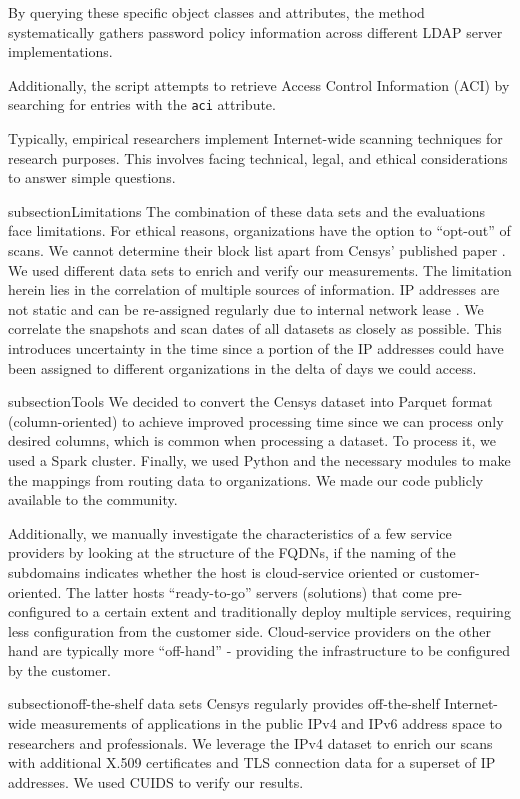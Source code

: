 By querying these specific object classes and attributes, the method systematically gathers password policy information across different LDAP server implementations. 

Additionally, the script attempts to retrieve Access Control Information (ACI) by searching for entries with the \texttt{aci} attribute. 

Typically, empirical researchers implement Internet-wide scanning techniques for research purposes. This involves facing technical, legal, and ethical considerations to answer simple questions.

subsection{Limitations}
The combination of these data sets and the evaluations face limitations. For ethical reasons, organizations have the option to ``opt-out'' of scans. We cannot determine their block list apart from Censys' published paper \cite{censys15}. 
We used different data sets to enrich and verify our measurements. The limitation herein lies in the correlation of multiple sources of information. \gls{IP} addresses are not static and can be re-assigned regularly due to internal network lease \cite{Moura2015}. We correlate the snapshots and scan dates of all datasets as closely as possible. This introduces uncertainty in the time since a portion of the \gls{IP} addresses could have been assigned to different organizations in the delta of days we could access.

subsection{Tools}
We decided to convert the Censys dataset into Parquet format (column-oriented) to achieve improved processing time since we can process only desired columns, which is common when processing a dataset. To process it, we used a Spark cluster. Finally, we used Python and the necessary modules to make the mappings from routing data to organizations. We made our code publicly available to the community.

Additionally, we manually investigate the characteristics of a few service providers by looking at the structure of the \gls{FQDN}s, \ie if the naming of the subdomains indicates whether the host is cloud-service oriented or customer-oriented. The latter hosts ``ready-to-go'' servers (solutions) that come pre-configured to a certain extent and traditionally deploy multiple services, requiring less configuration from the customer side. Cloud-service providers on the other hand are typically more ``off-hand'' - providing the infrastructure to be configured by the customer.

subsection{off-the-shelf data sets}
Censys regularly provides off-the-shelf Internet-wide measurements of applications in the public IPv4 and IPv6 address space to researchers \cite{censys15} and professionals. We leverage the IPv4 dataset to enrich our scans with additional X.509 certificates and \gls{TLS} connection data for a superset of \gls{IP} addresses. We used \gls{CUIDS} to verify our results.

